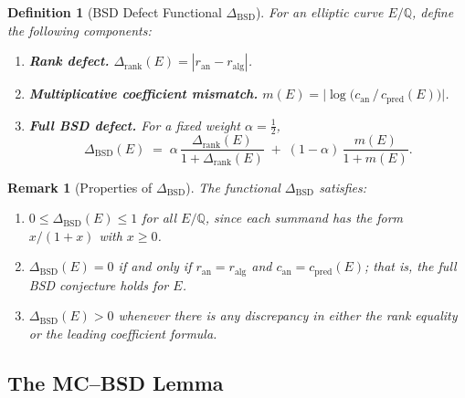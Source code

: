 \documentclass[11pt]{article}
\newtheorem{definition}[theorem]{Definition}
\newtheorem{remark}[theorem]{Remark}
\begin{document}
\begin{definition}[BSD Defect Functional $\Delta_{\mathrm{BSD}}$]
\label{def:bsd-defect}
For an elliptic curve $E/\mathbb{Q}$, define the following components:
\begin{enumerate}
\item \textbf{Rank defect.}\quad
  $\Delta_{\mathrm{rank}}(E) = |r_{\mathrm{an}} - r_{\mathrm{alg}}|$.
\item \textbf{Multiplicative coefficient mismatch.}\quad
  $m(E) = \bigl|\!\log\!\bigl(c_{\mathrm{an}} \,/\, c_{\mathrm{pred}}(E)\bigr)\bigr|$.
\item \textbf{Full BSD defect.}\quad
  For a fixed weight $\alpha = \tfrac{1}{2}$,
  \[
    \Delta_{\mathrm{BSD}}(E)
    \;=\;
    \alpha\,\frac{\Delta_{\mathrm{rank}}(E)}{1 + \Delta_{\mathrm{rank}}(E)}
    \;+\;
    (1 - \alpha)\,\frac{m(E)}{1 + m(E)}.
  \]
\end{enumerate}
\end{definition}

\begin{remark}[Properties of $\Delta_{\mathrm{BSD}}$]
\label{rem:delta-props}
The functional $\Delta_{\mathrm{BSD}}$ satisfies:
\begin{enumerate}
\item $0 \le \Delta_{\mathrm{BSD}}(E) \le 1$ for all $E/\mathbb{Q}$, since each
  summand has the form $x/(1+x)$ with $x \ge 0$.
\item $\Delta_{\mathrm{BSD}}(E) = 0$ if and only if $r_{\mathrm{an}} =
  r_{\mathrm{alg}}$ and $c_{\mathrm{an}} = c_{\mathrm{pred}}(E)$; that is,
  the full BSD conjecture holds for $E$.
\item $\Delta_{\mathrm{BSD}}(E) > 0$ whenever there is any discrepancy in
  either the rank equality or the leading coefficient formula.
\end{enumerate}
\end{remark}

\subsection{The MC--BSD Lemma}
\end{document}
